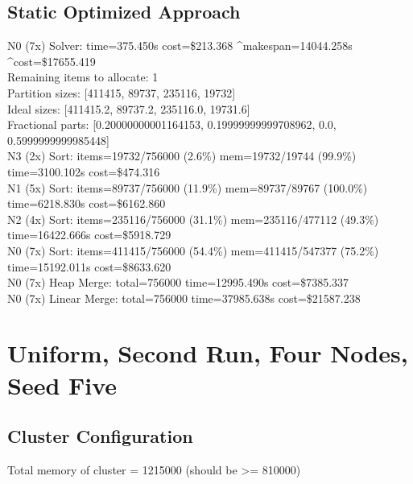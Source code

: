 \documentclass[]{interact}
\theoremstyle{plain}
\theoremstyle{definition}
\theoremstyle{remark}
\begin{document}
\subsection{Static Optimized Approach}
N0 (7x) Solver: time=375.450\textmu s cost=\$213.368 \^{}makespan=14044.258\textmu s \^{}cost=\$17655.419\\
Remaining items to allocate: 1\\
Partition sizes: [411415, 89737, 235116, 19732]\\
Ideal sizes: [411415.2, 89737.2, 235116.0, 19731.6]\\
Fractional parts: [0.20000000001164153, 0.19999999999708962, 0.0, 0.5999999999985448]\\
N3 (2x) Sort: items=19732/756000 (2.6\%) mem=19732/19744 (99.9\%) time=3100.102\textmu s cost=\$474.316\\
N1 (5x) Sort: items=89737/756000 (11.9\%) mem=89737/89767 (100.0\%) time=6218.830\textmu s cost=\$6162.860\\
N2 (4x) Sort: items=235116/756000 (31.1\%) mem=235116/477112 (49.3\%) time=16422.666\textmu s cost=\$5918.729\\
N0 (7x) Sort: items=411415/756000 (54.4\%) mem=411415/547377 (75.2\%) time=15192.011\textmu s cost=\$8633.620\\
N0 (7x) Heap Merge: total=756000 time=12995.490\textmu s cost=\$7385.337\\
N0 (7x) Linear Merge: total=756000 time=37985.638\textmu s cost=\$21587.238

\clearpage %

\section{Uniform, Second Run, Four Nodes, Seed Five}

\subsection{Cluster Configuration}
Total memory of cluster = 1215000 (should be >= 810000)
\end{document}
